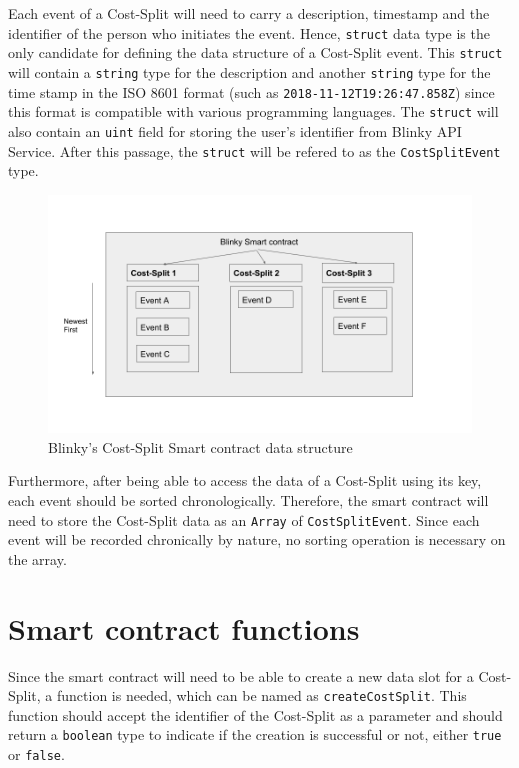 \documentclass[twoside,numperchapter]{tutthesis} %
\begin{document}
Each event of a Cost-Split will need to carry a description, timestamp and the identifier of the person who initiates the event. Hence, \texttt{struct} data type is the only candidate for defining the data structure of a Cost-Split event. This \texttt{struct} will contain a \texttt{string} type for the description and another \texttt{string} type for the time stamp in the ISO 8601 format \citep{ISOFormat} (such as \texttt{2018-11-12T19:26:47.858Z}) since this format is compatible with various programming languages. The \texttt{struct} will also contain an \texttt{uint} field for storing the user's identifier from Blinky API Service. After this passage, the \texttt{struct} will be refered to as the \texttt{CostSplitEvent} type.
\label{DataStructure}

\begin{figure}
    \centering
    \includegraphics[width=\linewidth]{BlinkyCostSplitSmartContractDataStructure.png}
    \caption{Blinky's Cost-Split Smart contract data structure \citep{RefWorks:doc:MasteringBlockchain}}
    \label{fig:smartcontractdatastructure}
\end{figure}


Furthermore, after being able to access the data of a Cost-Split using its key, each event should be sorted chronologically. Therefore, the smart contract will need to store the Cost-Split data as an \texttt{Array} of \texttt{CostSplitEvent}. Since each event will be recorded chronically by nature, no sorting operation is necessary on the array.

\section{Smart contract functions}
\label{section:SmartContractFunctions}

Since the smart contract will need to be able to create a new data slot for a Cost-Split, a function is needed, which can be named as \texttt{createCostSplit}. This function should accept the identifier of the Cost-Split as a parameter and should return a \texttt{boolean} type to indicate if the creation is successful or not, either \texttt{true} or \texttt{false}.
\end{document}

